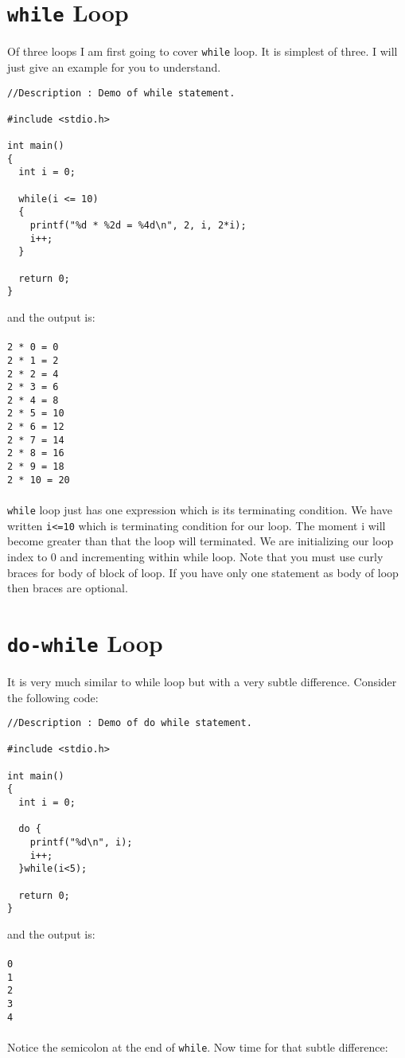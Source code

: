 \section{\texttt{while} Loop}
Of three loops I am first going to cover \texttt{while} loop. It is simplest of
three. I will just give an example for you to understand.

\begin{verbatim}
//Description : Demo of while statement.

#include <stdio.h>

int main()
{
  int i = 0;

  while(i <= 10)
  {
    printf("%d * %2d = %4d\n", 2, i, 2*i);
    i++;
  }

  return 0;
}
\end{verbatim}
and the output is:
\\\\\texttt{2 *  0 =    0\\
2 *  1 =    2\\
2 *  2 =    4\\
2 *  3 =    6\\
2 *  4 =    8\\
2 *  5 =   10\\
2 *  6 =   12\\
2 *  7 =   14\\
2 *  8 =   16\\
2 *  9 =   18\\
2 * 10 =   20\\\\}
\texttt{while} loop just has one expression which is its terminating
condition. We have written \texttt{i<=10} which is terminating condition for
our loop. The moment i will become greater than that the loop will
terminated. We are initializing our loop index to 0 and incrementing within
while loop. Note that you must use curly braces for body of block of loop. If
you have only one statement as body of loop then braces are optional.

\section{\texttt{do-while} Loop}
It is very much similar to while loop but with a very subtle
difference. Consider the following code:

\begin{verbatim}
//Description : Demo of do while statement.

#include <stdio.h>

int main()
{
  int i = 0;

  do {
    printf("%d\n", i);
    i++;
  }while(i<5);

  return 0;
}
\end{verbatim}
and the output is:
\\\\\texttt{0\\
1\\
2\\
3\\
4\\\\}
Notice the semicolon at the end of \texttt{while}. Now time for that subtle
difference:

